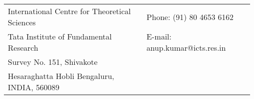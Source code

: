 \vspace{.05in}
\begin{tabular}{@{}p{3.5in}p{3in}}
International Centre for Theoretical Sciences & {Phone:} (91) 80 4653 6162 \\
Tata Institute of Fundamental Research & {E-mail:} anup.kumar@icts.res.in\\
Survey No. 151, Shivakote \\
Hesaraghatta Hobli
Bengaluru, INDIA, 560089
\end{tabular}
